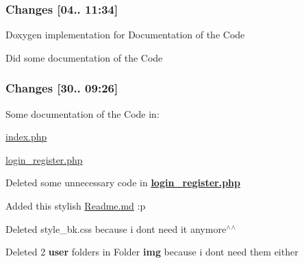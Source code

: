 \subsubsection*{Changes \mbox{[}04.. 11\+:34\mbox{]}}


\begin{DoxyEnumerate}
\item Doxygen implementation for Documentation of the Code
\end{DoxyEnumerate}
\begin{DoxyEnumerate}
\item Did some documentation of the Code
\end{DoxyEnumerate}

\subsubsection*{Changes \mbox{[}30.. 09\+:26\mbox{]}}


\begin{DoxyEnumerate}
\item Some documentation of the Code in\+:
\begin{DoxyItemize}
\item \mbox{\hyperlink{index_8php}{index.\+php}}
\item \mbox{\hyperlink{login__register_8php}{login\+\_\+register.\+php}}
\end{DoxyItemize}
\end{DoxyEnumerate}
\begin{DoxyEnumerate}
\item Deleted some unnecessary code in {\bfseries \mbox{\hyperlink{login__register_8php}{login\+\_\+register.\+php}}}
\end{DoxyEnumerate}
\begin{DoxyEnumerate}
\item Added this stylish \mbox{\hyperlink{_readme_8md}{Readme.\+md}} \+:p
\end{DoxyEnumerate}
\begin{DoxyEnumerate}
\item Deleted style\+\_\+bk.\+css because i don\textquotesingle{}t need it anymore$^\wedge$$^\wedge$
\end{DoxyEnumerate}
\begin{DoxyEnumerate}
\item Deleted 2 {\bfseries user} folders in Folder {\bfseries img} because i don\textquotesingle{}t need them either 
\end{DoxyEnumerate}